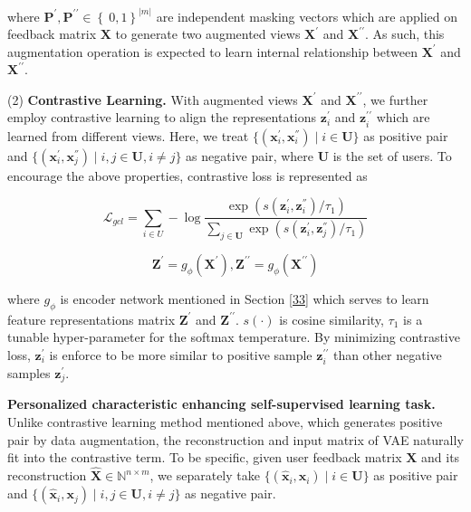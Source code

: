 where $\mathbf{P^{\prime}},\mathbf{P^{\prime\prime}}\in\left\{ \ 0,1 \right\}^{\lvert m \rvert}$ are independent masking vectors which are applied on feedback matrix $\mathbf{X}$ to generate two augmented views $\mathbf{X}^{\prime}$ and $\mathbf{X}^{\prime\prime}$. As such, this augmentation operation is expected to learn internal relationship between $\mathbf{X}^{\prime}$ and $\mathbf{X}^{\prime\prime}$.

(2) \textbf{Contrastive Learning.} With augmented views $\mathbf{X}^{\prime}$ and $\mathbf{X}^{\prime\prime}$,  we further employ contrastive learning to align the representations $\mathbf{z}_i^{\prime}$ and $\mathbf{z}_i^{\prime\prime}$ which are learned from different views. %
Here, we treat $\{(\mathbf{x}_i^{'},\mathbf{x}_i^{''}) \mid i \in \mathbf{U}\}$ as positive pair and
$\{(\mathbf{x}_i^{'},\mathbf{x}_j^{''}) \mid i,j \in \mathbf{U}, i \neq j\}$ as negative pair, where $\mathbf{U}$ is the set of users. To encourage the above properties, contrastive loss is represented as


\begin{equation}
\mathcal{L}_{gcl} = \sum_{i\in U}-\log\frac{\exp(s(\mathbf{z}_i^{'},\mathbf{z}_i^{''})/\tau_1)}{\sum_{j\in \mathbf{U}} \exp(s(\mathbf{z}_i^{'},\mathbf{z}_j^{''})/\tau_1)}
\label{eq7}
\end{equation}

\begin{equation}
\mathbf{Z}^{\prime} = g_{\phi}\left(\mathbf{X}^{\prime}\right), \mathbf{Z}^{\prime\prime}=g_{\phi}\left(\mathbf{X}^{\prime\prime}\right)
\label{eq8}
\end{equation}


where $g_{\phi}$ is encoder network mentioned in Section \ref{33}  which serves to learn feature representations matrix $\mathbf{Z}^{\prime}$ and $\mathbf{Z}^{\prime\prime}$. $s(\cdot) $ is cosine similarity, $\tau_1$ is a tunable hyper-parameter for the softmax temperature.  
By minimizing contrastive loss, $\mathbf{z}_i^{\prime}$ is enforce to be more similar to positive sample $\mathbf{z}_i^{\prime\prime}$ than other negative samples $\mathbf{z}_j^{\prime}$. 

\textbf{Personalized characteristic enhancing self-supervised learning task.} Unlike contrastive learning method mentioned above, which generates positive pair by data augmentation, the reconstruction and input matrix of VAE naturally fit into the contrastive term. To be specific, given user feedback matrix $\mathbf{X}$ and its reconstruction $\hat{\mathbf{X}}\in \mathbb{N}^{n\times m}$, we separately take  $\{(\hat{\mathbf{x}}_i,\mathbf{x}_i) \mid i \in \mathbf{U}\}$ as positive pair and $\{(\hat{\mathbf{x}}_i,\mathbf{x}_j) \mid i,j \in \mathbf{U}, i \neq j\}$ as negative pair. 
 

